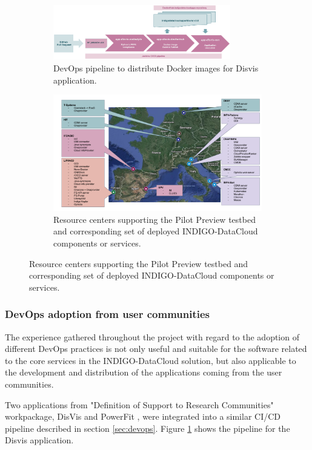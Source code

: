 \documentclass[journal]{IEEEtran}
\begin{document}
\begin{figure}	
	\centering
	\begin{subfigure}
		\centering
\includegraphics[width=0.85\textwidth]{images/disvis-flow.png}
\caption{DevOps pipeline to distribute Docker images for Disvis application.}
\label{fig:fig_disvis}		
	\end{subfigure}
	\quad
	\begin{subfigure}
		\centering
\includegraphics[width=\textwidth]{images/pilotpreview.png}
\caption{Resource centers supporting the Pilot Preview testbed and corresponding
set of deployed INDIGO-DataCloud components or services.}
\label{fig:fig_pilotpreview}
	\end{subfigure}
\end{figure}


\subsubsection{DevOps adoption from user communities}

The experience gathered throughout the project with regard to the adoption of
different DevOps practices is not only useful and suitable for the software related
to the core services in the INDIGO-DataCloud solution, but also applicable to the
development and distribution of the applications coming from the user communities.

Two applications from "Definition of Support to Research Communities" workpackage, 
DisVis \cite{disvis} and PowerFit \cite{powerfit}, were
integrated into a similar CI/CD pipeline described in section \ref{sec:devops}.
Figure \ref{fig:fig_disvis} shows the pipeline for the Disvis application.
\end{document}
